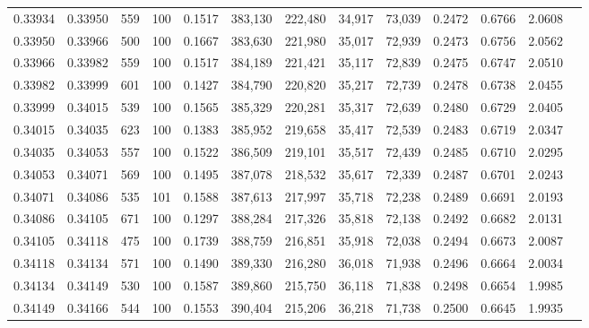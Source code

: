 \begin{tabular}{rrrrrrrrrrrrr}
0.33934 & 0.33950 &   559 & 100 &                                     0.1517 & 383,130 & 222,480 &  34,917 &  73,039 & 0.2472 & 0.6766 & 2.0608 \\
0.33950 & 0.33966 &   500 & 100 &                                     0.1667 & 383,630 & 221,980 &  35,017 &  72,939 & 0.2473 & 0.6756 & 2.0562 \\
0.33966 & 0.33982 &   559 & 100 &                                     0.1517 & 384,189 & 221,421 &  35,117 &  72,839 & 0.2475 & 0.6747 & 2.0510 \\
0.33982 & 0.33999 &   601 & 100 &                                     0.1427 & 384,790 & 220,820 &  35,217 &  72,739 & 0.2478 & 0.6738 & 2.0455 \\
0.33999 & 0.34015 &   539 & 100 &                                     0.1565 & 385,329 & 220,281 &  35,317 &  72,639 & 0.2480 & 0.6729 & 2.0405 \\
0.34015 & 0.34035 &   623 & 100 &                                     0.1383 & 385,952 & 219,658 &  35,417 &  72,539 & 0.2483 & 0.6719 & 2.0347 \\
0.34035 & 0.34053 &   557 & 100 &                                     0.1522 & 386,509 & 219,101 &  35,517 &  72,439 & 0.2485 & 0.6710 & 2.0295 \\
0.34053 & 0.34071 &   569 & 100 &                                     0.1495 & 387,078 & 218,532 &  35,617 &  72,339 & 0.2487 & 0.6701 & 2.0243 \\
0.34071 & 0.34086 &   535 & 101 &                                     0.1588 & 387,613 & 217,997 &  35,718 &  72,238 & 0.2489 & 0.6691 & 2.0193 \\
0.34086 & 0.34105 &   671 & 100 &                                     0.1297 & 388,284 & 217,326 &  35,818 &  72,138 & 0.2492 & 0.6682 & 2.0131 \\
0.34105 & 0.34118 &   475 & 100 &                                     0.1739 & 388,759 & 216,851 &  35,918 &  72,038 & 0.2494 & 0.6673 & 2.0087 \\
0.34118 & 0.34134 &   571 & 100 &                                     0.1490 & 389,330 & 216,280 &  36,018 &  71,938 & 0.2496 & 0.6664 & 2.0034 \\
0.34134 & 0.34149 &   530 & 100 &                                     0.1587 & 389,860 & 215,750 &  36,118 &  71,838 & 0.2498 & 0.6654 & 1.9985 \\
0.34149 & 0.34166 &   544 & 100 &                                     0.1553 & 390,404 & 215,206 &  36,218 &  71,738 & 0.2500 & 0.6645 & 1.9935 \\

\end{tabular}
